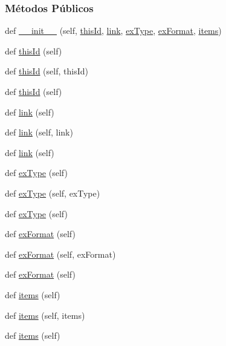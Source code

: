 \subsubsection*{Métodos Públicos}
\begin{DoxyCompactItemize}
\item 
def \hyperlink{classELO_1_1EntityUnit_1_1Exercise_ab3082d56bfc94d7a13519ccc12d43b1d}{\+\_\+\+\_\+init\+\_\+\+\_\+} (self, \hyperlink{classELO_1_1EntityUnit_1_1Exercise_a6277daccaa7fe96d8f0a287002cea07a}{this\+Id}, \hyperlink{classELO_1_1EntityUnit_1_1Exercise_a13a9382d9126f07ab380ea11df276ed8}{link}, \hyperlink{classELO_1_1EntityUnit_1_1Exercise_af982926b59b32980803f93f40b383d77}{ex\+Type}, \hyperlink{classELO_1_1EntityUnit_1_1Exercise_a0d17db96aa0caa63df47795c50818e9f}{ex\+Format}, \hyperlink{classELO_1_1EntityUnit_1_1Exercise_a14ec766ff723672be49ea5c9438744c8}{items})
\item 
def \hyperlink{classELO_1_1EntityUnit_1_1Exercise_a08d2177411dd803182cc9b22fb8951d3}{this\+Id} (self)
\item 
def \hyperlink{classELO_1_1EntityUnit_1_1Exercise_a8e9d9051a87ac4de433378b76aaebd50}{this\+Id} (self, this\+Id)
\item 
def \hyperlink{classELO_1_1EntityUnit_1_1Exercise_a08d2177411dd803182cc9b22fb8951d3}{this\+Id} (self)
\item 
def \hyperlink{classELO_1_1EntityUnit_1_1Exercise_a655fe652bfb708878ab9725a9da18a10}{link} (self)
\item 
def \hyperlink{classELO_1_1EntityUnit_1_1Exercise_a32a0758b492fad1363651b00628050d5}{link} (self, link)
\item 
def \hyperlink{classELO_1_1EntityUnit_1_1Exercise_a655fe652bfb708878ab9725a9da18a10}{link} (self)
\item 
def \hyperlink{classELO_1_1EntityUnit_1_1Exercise_a86a71841ee762b2e85da2222baa19b55}{ex\+Type} (self)
\item 
def \hyperlink{classELO_1_1EntityUnit_1_1Exercise_aa35d95fe051cd69a51c04bcfc8aa3db3}{ex\+Type} (self, ex\+Type)
\item 
def \hyperlink{classELO_1_1EntityUnit_1_1Exercise_a86a71841ee762b2e85da2222baa19b55}{ex\+Type} (self)
\item 
def \hyperlink{classELO_1_1EntityUnit_1_1Exercise_aec6bfb3b8ce079fc8495493d0b851c1c}{ex\+Format} (self)
\item 
def \hyperlink{classELO_1_1EntityUnit_1_1Exercise_a9db441f838d04b98091a35c0606cb0e1}{ex\+Format} (self, ex\+Format)
\item 
def \hyperlink{classELO_1_1EntityUnit_1_1Exercise_aec6bfb3b8ce079fc8495493d0b851c1c}{ex\+Format} (self)
\item 
def \hyperlink{classELO_1_1EntityUnit_1_1Exercise_a9f3c7f7e3d3b9bdbb6a2cf4ed5d412bb}{items} (self)
\item 
def \hyperlink{classELO_1_1EntityUnit_1_1Exercise_af1cad2982478026523e6c3e6c63b4025}{items} (self, items)
\item 
def \hyperlink{classELO_1_1EntityUnit_1_1Exercise_a9f3c7f7e3d3b9bdbb6a2cf4ed5d412bb}{items} (self)
\end{DoxyCompactItemize}
